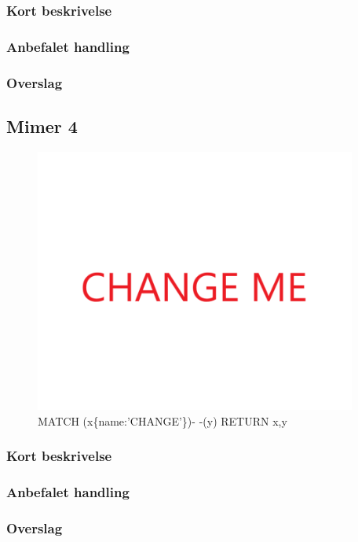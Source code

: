 \documentclass{article}
\begin{document}
\subsubsection{Kort beskrivelse}
\subsubsection{Anbefalet handling}
\subsubsection{Overslag}
\subsection{Mimer 4}
\begin{figure}[h]
\includegraphics[width=300pt]{CHANGE.PNG}
\caption{MATCH (x\{name:'CHANGE'\})- -(y) RETURN x,y}
\end{figure}
\subsubsection{Kort beskrivelse}
\subsubsection{Anbefalet handling}
\subsubsection{Overslag}
\end{document}
